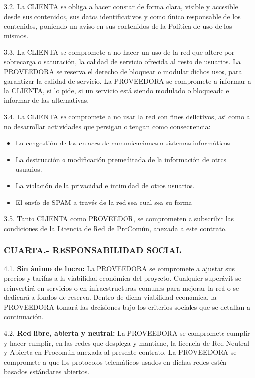 \documentclass[11pt,spanish,a4paper,]{article}
\begin{document}
3.2. La CLIENTA se obliga a hacer constar de forma clara, visible y
accesible desde sus contenidos, sus datos identificativos y como único
responsable de los contenidos, poniendo un aviso en sus contenidos de la
Política de uso de los mismos.

3.3. La CLIENTA se compromete a no hacer un uso de la red que altere por
sobrecarga o saturación, la calidad de servicio ofrecida al resto de
usuarios. La PROVEEDORA se reserva el derecho de bloquear o modular
dichos usos, para garantizar la calidad de servicio. La PROVEEDORA se
compromete a informar a la CLIENTA, si lo pide, si un servicio está
siendo modulado o bloqueado e informar de las alternativas.

3.4. La CLIENTA se compromete a no usar la red con fines delictivos, asi
como a no desarrollar actividades que persigan o tengan como
consecuencia:

\begin{itemize}
\itemsep1pt\parskip0pt
\item
  La congestión de los enlaces de comunicaciones o sistemas
  informáticos.
\item
  La destrucción o modificación premeditada de la información de otros
  usuarios.
\item
  La violación de la privacidad e intimidad de otros usuarios.
\item
  El envío de SPAM a través de la red sea cual sea su forma
\end{itemize}

3.5. Tanto CLIENTA como PROVEEDOR, se comprometen a subscribir las
condiciones de la Licencia de Red de ProComún, anexada a este contrato.

\subsubsection{CUARTA.- RESPONSABILIDAD
SOCIAL}\label{cuarta.--responsabilidad-social}

4.1. \textbf{Sin ánimo de lucro:} La PROVEEDORA se compromete a ajustar
sus precios y tarifas a la viabilidad económica del proyecto. Cualquier
superávit se reinvertirá en servicios o en infraestructuras comunes para
mejorar la red o se dedicará a fondos de reserva. Dentro de dicha
viabilidad económica, la PROVEEDORA tomará las decisiones bajo los
criterios sociales que se detallan a continuación.

4.2. \textbf{Red libre, abierta y neutral:} La PROVEEDORA se compromete
cumplir y hacer cumplir, en las redes que desplega y mantiene, la
licencia de Red Neutral y Abierta en Procomún anexada al presente
contrato. La PROVEEDORA se compromete a que los protocolos telemáticos
usados en dichas redes estén basados estándares abiertos.
\end{document}
